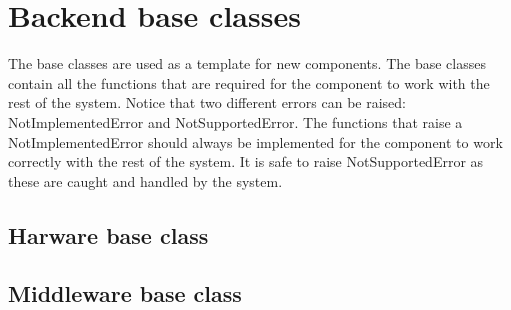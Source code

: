 \documentclass[11pt]{article}
\begin{document}
\clearpage
\section{Backend base classes}
The base classes are used as a template for new components. The base classes contain all the functions that are required for the component to work with the rest of the system. Notice that two different errors can be raised: NotImplementedError and NotSupportedError. The functions that raise a NotImplementedError should always be implemented for the component to work correctly with the rest of the system. It is safe to raise NotSupportedError as these are caught and handled by the system.

\label{ap:backend_base_classes}
\subsection*{Harware base class}
\label{ap:hardware_base_class}


\clearpage
\subsection*{Middleware base class}
\label{ap:middleware_base_class}








\end{document}
